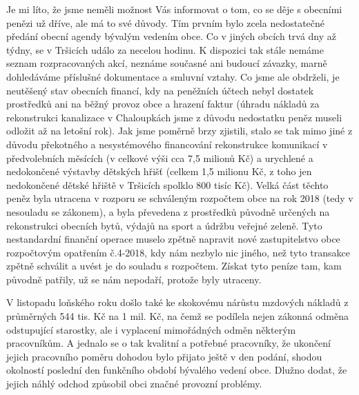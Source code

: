 \documentclass[10pt]{article}
\begin{document}
\begin{multicols}{2}
{Je mi líto, že jsme neměli možnost Vás informovat o tom, co se děje s obecními penězi už dříve, ale má to své důvody. Tím prvním bylo zcela nedostatečné předání obecní agendy bývalým vedením obce. Co v jiných obcích trvá dny až týdny, se v Tršicích událo za necelou hodinu. K dispozici tak stále nemáme seznam rozpracovaných akcí, neznáme současné ani budoucí závazky, marně dohledáváme příslušné dokumentace a smluvní vztahy. Co jsme ale obdrželi, je neutěšený stav obecních financí, kdy na peněžních účtech nebyl dostatek prostředků ani na běžný provoz obce a hrazení faktur (úhradu nákladů za rekonstrukci kanalizace v Chaloupkách jsme z důvodu nedostatku peněz museli odložit až na letošní rok). Jak jsme poměrně brzy zjistili, stalo se tak mimo jiné z důvodu překotného a nesystémového financování rekonstrukce komunikací v předvolebních měsících (v celkové výši cca 7,5 milionů Kč) a urychlené a nedokončené výstavby dětských hřišť (celkem 1,5 milionu Kč, z toho jen nedokončené dětské hřiště v Tršicích spolklo 800 tisíc Kč). Velká část těchto peněz byla utracena v rozporu se schváleným rozpočtem obce na rok 2018 (tedy v nesouladu se zákonem), a byla převedena z prostředků původně určených na rekonstrukci obecních bytů, výdajů na sport a údržbu veřejné zeleně. Tyto nestandardní finanční operace muselo zpětně napravit nové zastupitelstvo obce rozpočtovým opatřením č.4-2018, kdy nám nezbylo nic jiného, než tyto transakce zpětně schválit a uvést je do souladu s rozpočtem. Získat tyto peníze tam, kam původně patřily, už se nám nepodaří, protože byly utraceny.

V listopadu loňského roku došlo také ke skokovému nárůstu mzdových nákladů z průměrných 544 tis. Kč na 1 mil. Kč, na čemž se podílela nejen zákonná odměna odstupující starostky, ale i vyplacení mimořádných odměn některým pracovníkům. A jednalo se o tak kvalitní a potřebné pracovníky, že ukončení jejich pracovního poměru dohodou bylo přijato ještě v den podání, shodou okolností poslední den funkčního období bývalého vedení obce. Dlužno dodat, že jejich náhlý odchod způsobil obci značné provozní problémy.

}
\end{multicols}
\end{document}
